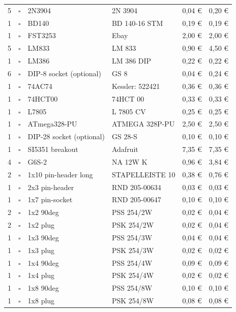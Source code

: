 \documentclass[10pt, a4paper,twoside]{scrartcl}
\begin{document}
\begin{longtable}{|p{}|p{}|p{}|p{}|p{}|p{}|}
5 & $\square$ & 2N3904 & 2N 3904 & 0,04 \euro & 0,20 \euro \\
1 & $\square$ & BD140 & BD 140-16 STM & 0,19 \euro & 0,19 \euro \\
1 & $\square$ & FST3253 & Ebay & 2,00 \euro & 2,00 \euro \\
5 & $\square$ & LM833 & LM 833 & 0,90 \euro & 4,50 \euro \\
1 & $\square$ & LM386 & LM 386 DIP & 0,22 \euro & 0,22 \euro \\
6 & $\square$ & DIP-8 socket (optional) & GS 8 & 0,04 \euro & 0,24 \euro \\
1 & $\square$ & 74AC74 & Kessler: 522421 & 0,36 \euro & 0,36 \euro \\
1 & $\square$ & 74HCT00 & 74HCT 00 & 0,33 \euro & 0,33 \euro \\
1 & $\square$ & L7805 & L 7805 CV & 0,25 \euro & 0,25 \euro \\
1 & $\square$ & ATmega328-PU & ATMEGA 328P-PU & 2,50 \euro & 2,50 \euro \\
1 & $\square$ & DIP-28 socket (optional) & GS 28-S & 0,10 \euro & 0,10 \euro \\
1 & $\square$ & SI5351 breakout & Adafruit & 7,35 \euro & 7,35 \euro \\ \hline
4 & $\square$ & G6S-2 & NA 12W K & 0,96 \euro & 3,84 \euro \\ \hline
2 & $\square$ & 1x10 pin-header long & STAPELLEISTE 10 & 0,38 \euro & 0,76 \euro \\
1 & $\square$ & 2x3 pin-header & RND 205-00634 & 0,03 \euro & 0,03 \euro \\
1 & $\square$ & 1x7 pin-socket & RND 205-00647 & 0,10 \euro & 0,10 \euro \\
2 & $\square$ & 1x2 90deg & PSS 254/2W & 0,02 \euro & 0,04 \euro \\
2 & $\square$ & 1x2 plug & PSK 254/2W & 0,02 \euro & 0,04 \euro \\
1 & $\square$ & 1x3 90deg & PSS 254/3W & 0,04 \euro & 0,04 \euro \\
1 & $\square$ & 1x3 plug & PSK 254/3W & 0,02 \euro & 0,02 \euro \\
1 & $\square$ & 1x4 90deg & PSS 254/4W & 0,09 \euro & 0,09 \euro \\
1 & $\square$ & 1x4 plug & PSK 254/4W & 0,02 \euro & 0,02 \euro \\
1 & $\square$ & 1x8 90deg & PSS 254/8W & 0,10 \euro & 0,10 \euro \\
1 & $\square$ & 1x8 plug & PSK 254/8W & 0,08 \euro & 0,08 \euro \\

\end{longtable}
\end{document}
